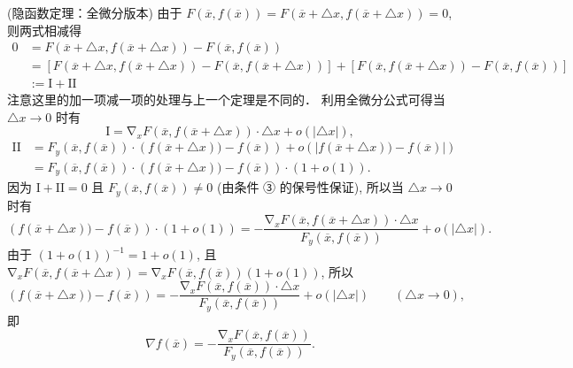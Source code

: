\begin{theorem}{(隐函数定理：全微分版本)}
由于 $F(\overline{x},f(\overline{x}))=F(\overline{x}+\triangle x,f(\overline{x}+\triangle x))=0$,
则两式相减得
\begin{equation}
\begin{aligned}
0 & = F(\overline{x}+\triangle x,f(\overline{x}+\triangle x))-F(\overline{x},f(\overline{x}))\\
 & = \left[F(\overline{x}+\triangle x,f(\overline{x}+\triangle x))-F(\overline{x},f(\overline{x}+\triangle x))\right]+\left[F(\overline{x},f(\overline{x}+\triangle x))-F(\overline{x},f(\overline{x}))\right]\\
 & := \mathrm{I}+\mathrm{II}
\end{aligned}
\end{equation}
注意这里的加一项减一项的处理与上一个定理是不同的． 利用全微分公式可得当 $\triangle x\rightarrow0$ 时有
\[
\mathrm{I}=\mathrm{\nabla}_{x}F(\overline{x},f(\overline{x}+\triangle x))\cdot\triangle x+o(|\triangle x|),
\]
\begin{equation}
\begin{aligned}
\mathrm{II} & = F_{y}(\overline{x},f(\overline{x}))\cdot\left(f(\overline{x}+\triangle x))-f(\overline{x})\right)+o\left(|f(\overline{x}+\triangle x))-f(\overline{x})|\right)\\
 & = F_{y}(\overline{x},f(\overline{x}))\cdot\left(f(\overline{x}+\triangle x))-f(\overline{x})\right)\cdot(1+o(1)).
\end{aligned}
\end{equation}
因为 $\mathrm{I}+\mathrm{II}=0$ 且 $F_{y}(\overline{x},f(\overline{x}))\neq0$
(由条件 ③ 的保号性保证), 所以当 $\triangle x\rightarrow0$ 时有
\[
\left(f(\overline{x}+\triangle x))-f(\overline{x})\right)\cdot(1+o(1))={\displaystyle -\frac{\mathrm{\nabla}_{x}F(\overline{x},f(\overline{x}+\triangle x))\cdot\triangle x}{F_{y}(\overline{x},f(\overline{x}))}+o(|\triangle x|).}
\]
由于 $(1+o(1))^{-1}=1+o(1)$, 且 $\mathrm{\nabla}_{x}F(\overline{x},f(\overline{x}+\triangle x))=\mathrm{\nabla}_{x}F(\overline{x},f(\overline{x}))(1+o(1))$,
所以
\[
\left(f(\overline{x}+\triangle x))-f(\overline{x})\right)={\displaystyle -\frac{\mathrm{\nabla}_{x}F(\overline{x},f(\overline{x}))\cdot\triangle x}{F_{y}(\overline{x},f(\overline{x}))}+o(|\triangle x|)\quad\quad(\triangle x\rightarrow0),}
\]
即 
\[
\nabla f(\overline{x})=-\frac{\mathrm{\nabla}_{x}F(\overline{x},f(\overline{x}))}{F_{y}(\overline{x},f(\overline{x}))}.
\]
\end{theorem}
